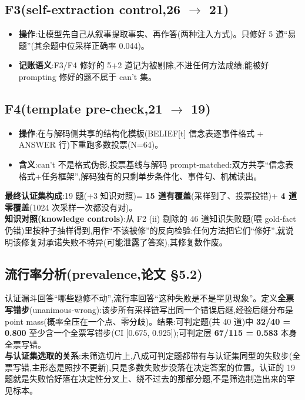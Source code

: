 \documentclass[fontset=none,10.5pt]{ctexart}
\begin{document}
\subsection{F3(self-extraction control,26 $\to$ 21)}

\begin{itemize}
\item \textbf{操作}:让模型先自己从叙事提取事实、再作答(两种注入方式)。只修好 5 道``易题''(其余题中位采样正确率 0.044)。
\item \textbf{记账语义}:F3/F4 修好的 5+2 道记为被剔除,不进任何方法成绩;能被好 prompting 修好的题不属于 can't 集。
\end{itemize}

\subsection{F4(template pre-check,21 $\to$ 19)}

\begin{itemize}
\item \textbf{操作}:在与解码侧共享的结构化模板(BELIEF[t] 信念表逐事件格式 + ANSWER 行)下重跑多数投票(N=64)。
\item \textbf{含义}:can't 不是格式伪影,投票基线与解码 prompt-matched:双方共享``信念表格式+任务框架'',解码独有的只剩单步条件化、事件句、机械读出。
\end{itemize}

\textbf{最终认证集构成}:19 题(+3 知识对照)= \textbf{15 道有覆盖}(采样到了、投票投错)+ \textbf{4 道零覆盖}(1024 次采样一次都没有对)。\\
\textbf{知识对照(knowledge controls)}:从 F2 (ii) 剔除的 46 道知识失败题(喂 gold-fact 仍错)里按种子抽样得到,用作``不该被修''的反向检验:任何方法把它们``修好'',就说明该修复对承诺失败不特异(可能泄露了答案),其修复数作废。

\subsection{流行率分析(prevalence,论文 \S 5.2)}

认证漏斗回答``哪些题修不动'',流行率回答``这种失败是不是罕见现象''。定义\textbf{全票写错步}(unanimous-wrong):该步所有采样链写出同一个错误后继,经验后继分布是 point mass(概率全压在一个点、零分歧)。结果:可判定题(共 40 道)中 \textbf{32/40 = 0.800} 至少含一个全票写错步(CI [0.675, 0.925]);可判定层 \textbf{67/115 = 0.583} 本身全票写错。\\
\textbf{与认证集选取的关系}:未筛选切片上,八成可判定题都带有与认证集同型的失败步(全票写错,主形态是照抄不更新),只是多数失败步没落在决定答案的位置。认证的 19 题就是失败恰好落在决定性分叉上、绕不过去的那部分题,不是筛选制造出来的罕见标本。
\end{document}
